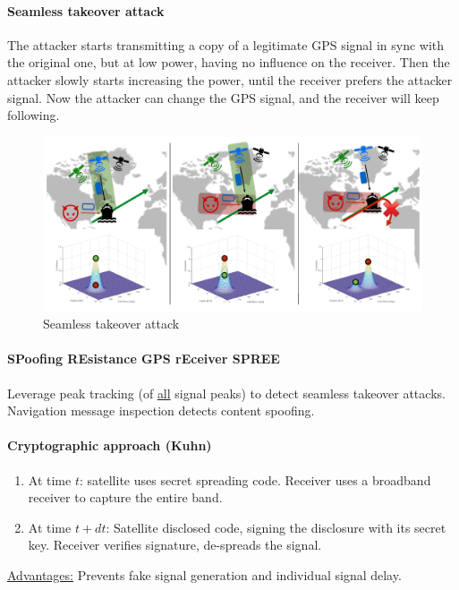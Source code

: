 \paragraph{Seamless takeover attack}
The attacker starts transmitting a copy of a legitimate GPS signal in sync with
the original one, but at low power, having no influence on the receiver. Then
the attacker slowly starts increasing the power, until the receiver prefers the
attacker signal. Now the attacker can change the GPS signal, and the receiver
will keep following.

\begin{figure}[h]
	\centering
	\includegraphics[scale=0.3]{images/4-seamless-takeover.png}
	\caption{Seamless takeover attack}%
	\label{fig:seamless-takeover}
\end{figure}

\paragraph{SPoofing REsistance GPS rEceiver SPREE}
Leverage peak tracking (of \underline{all} signal peaks) to detect seamless
takeover attacks. Navigation message inspection detects content spoofing.

\paragraph{Cryptographic approach (Kuhn)}
\begin{enumerate}
	\item At time $t$: satellite uses secret spreading code. Receiver uses a broadband
	      receiver to capture the entire band.
	\item At time $t+dt$: Satellite disclosed code, signing the disclosure with its
	      secret key. Receiver verifies signature, de-spreads the signal.
\end{enumerate}

\underline{Advantages:}
Prevents fake signal generation and individual signal delay.

